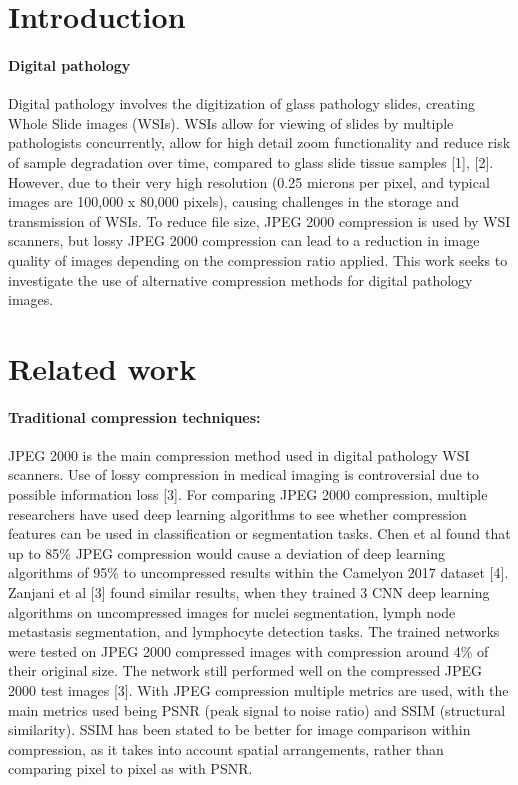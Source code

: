 \documentclass[review]{elsarticle}
\begin{document}
\linenumbers

\section{Introduction}
\paragraph{Digital pathology} Digital pathology involves the digitization of glass pathology slides, creating Whole Slide images (WSIs). WSIs allow for viewing of slides by multiple pathologists concurrently, allow for high detail zoom functionality and reduce risk of sample degradation over time, compared to glass slide tissue samples [1], [2]. However, due to their very high resolution (0.25 microns per pixel, and typical images are 100,000 x 80,000 pixels), causing challenges in the storage and transmission of WSIs. To reduce file size, JPEG 2000 compression is used by WSI scanners, but lossy JPEG 2000 compression can lead to a reduction in image quality of images depending on the compression ratio applied. This work seeks to investigate the use of alternative compression methods for digital pathology images.

\section{Related work}
\paragraph{Traditional compression techniques:}
JPEG 2000 is the main compression method used in digital pathology WSI scanners. Use of lossy compression in medical imaging is controversial due to possible information loss [3]. For comparing JPEG 2000 compression, multiple researchers have used deep learning algorithms to see whether compression features can be used in classification or segmentation tasks. Chen et al found that up to 85\% JPEG compression would cause a deviation of deep learning algorithms of 95\% to uncompressed results within the Camelyon 2017 dataset [4]. Zanjani et al [3] found similar results, when they trained 3 CNN deep learning algorithms on uncompressed images for nuclei segmentation, lymph node metastasis segmentation, and lymphocyte detection tasks. The trained networks were tested on JPEG 2000 compressed images with compression around 4\% of their original size. The network still performed well on the compressed JPEG 2000 test images [3].
With JPEG compression multiple metrics are used, with the main metrics used being PSNR (peak signal to noise ratio) and SSIM (structural similarity). SSIM has been stated to be better for image comparison within compression, as it takes into account spatial arrangements, rather than comparing pixel to pixel as with PSNR.
\end{document}
